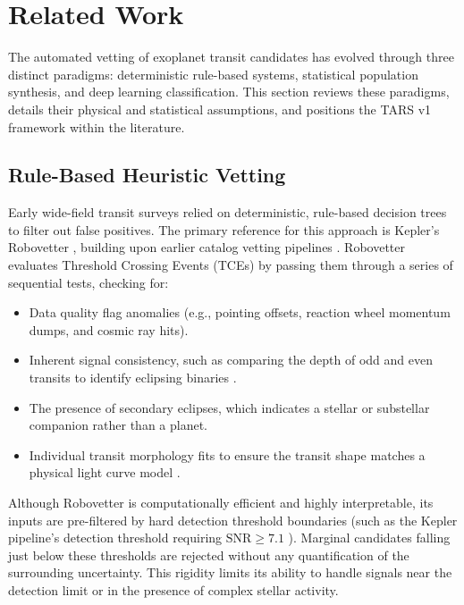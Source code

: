 \section{Related Work} \label{sec:related_work}

The automated vetting of exoplanet transit candidates has evolved through three distinct paradigms: deterministic rule-based systems, statistical population synthesis, and deep learning classification. This section reviews these paradigms, details their physical and statistical assumptions, and positions the TARS v1 framework within the literature.

\subsection{Rule-Based Heuristic Vetting} \label{sec:heuristic_vetting}
Early wide-field transit surveys relied on deterministic, rule-based decision trees to filter out false positives. The primary reference for this approach is Kepler’s Robovetter \citep{Coughlin2016, Thompson2018}, building upon earlier catalog vetting pipelines \citep{Jenkins2002, Jenkins2010, Mullally2015}. Robovetter evaluates Threshold Crossing Events (TCEs) by passing them through a series of sequential tests, checking for:
\begin{itemize}
\item Data quality flag anomalies (e.g., pointing offsets, reaction wheel momentum dumps, and cosmic ray hits).
\item Inherent signal consistency, such as comparing the depth of odd and even transits to identify eclipsing binaries \citep{Slawson2011, Prsa2011, Kirk2016}.
\item The presence of secondary eclipses, which indicates a stellar or substellar companion rather than a planet.
\item Individual transit morphology fits to ensure the transit shape matches a physical light curve model \citep{Mandel2002, Gimenez2006, Kreidberg2015, Kipping2013}.
\end{itemize}

Although Robovetter is computationally efficient and highly interpretable, its inputs are pre-filtered by hard detection threshold boundaries (such as the Kepler pipeline's detection threshold requiring $\text{SNR} \ge 7.1$ \citealt{Jenkins2010}). Marginal candidates falling just below these thresholds are rejected without any quantification of the surrounding uncertainty. This rigidity limits its ability to handle signals near the detection limit or in the presence of complex stellar activity.

